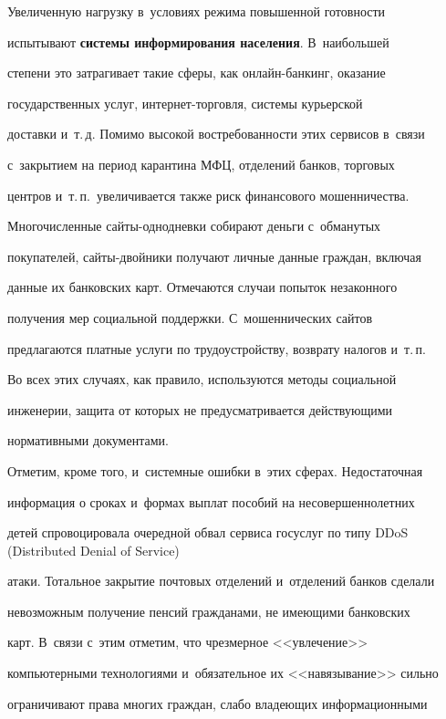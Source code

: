   


  Увеличенную нагрузку в~условиях режима повышенной готовности 


испытывают \textbf{системы информирования населения}. В~наибольшей 


степени это затрагивает такие сферы, как онлайн-банкинг, оказание 


государственных услуг, ин\-тер\-нет-тор\-гов\-ля, системы курьерской 


доставки и~т.\,д. Помимо высокой востребованности этих сервисов в~связи 


с~закрытием на период карантина МФЦ, отделений банков, торговых 


центров и~т.\,п.\ увеличивается также риск финансового мошенничества. 


Многочисленные сай\-ты-од\-но\-днев\-ки собирают деньги с~обманутых 


покупателей, сайты-двойники получают личные данные граждан, включая 


данные их банковских карт. Отмечаются случаи попыток незаконного 


получения мер социальной поддержки. С~мошеннических сайтов 


предлагаются платные услуги по трудоустройству, возврату налогов и~т.\,п. 


Во всех этих случаях, как правило, используются методы социальной 


инженерии, защита от которых не предусматривается действующими 


нормативными документами.


  


  Отметим, кроме того, и~системные ошибки в~этих сферах. Недостаточная 


информация о сроках и~формах выплат пособий на несовершеннолетних 


детей спровоцировала очередной обвал сервиса госуслуг по типу DDoS (Distributed Denial of Service)


атаки. Тотальное закрытие почтовых отделений и~отделений банков сделали 


невозможным получение пенсий гражданами, не имеющими банковских 


карт. В~связи с~этим отметим, что чрезмерное <<увлечение>> 


компьютерными технологиями и~обязательное их <<навязывание>> сильно 


ограничивают права многих граждан, слабо владеющих информационными 


